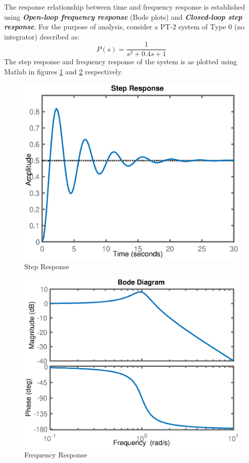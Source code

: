 The response relationship between time and frequency response is established using \textbf{\textit{Open-loop frequency response}} (Bode plots) and \textbf{\textit{Closed-loop step response}}. For the purpose of analysis, consider a PT-2 system of Type 0 (no integrator) described as:
\begin{equation}
	P(s) = \frac{1}{s^2 + 0.4s + 1}
\end{equation}
The step response and frequency response of the system is as plotted using Matlab in figures \ref{Fig_FreqCDStepResp} and \ref{Fig_FreqCDFreqResp} respectively.
\begin{figure}[h!]
	\centering
	\includegraphics[width=0.8\linewidth]{Bilder/FreqCDesignStepResponse.eps}
	\caption{Step Response}
	\label{Fig_FreqCDStepResp}
\end{figure}
\begin{figure}[h!]
	\centering
	\includegraphics[width=0.8\linewidth]{Bilder/FreqCDesignFreqResp.eps}
	\caption{Frequency Response}
	\label{Fig_FreqCDFreqResp}
\end{figure}

